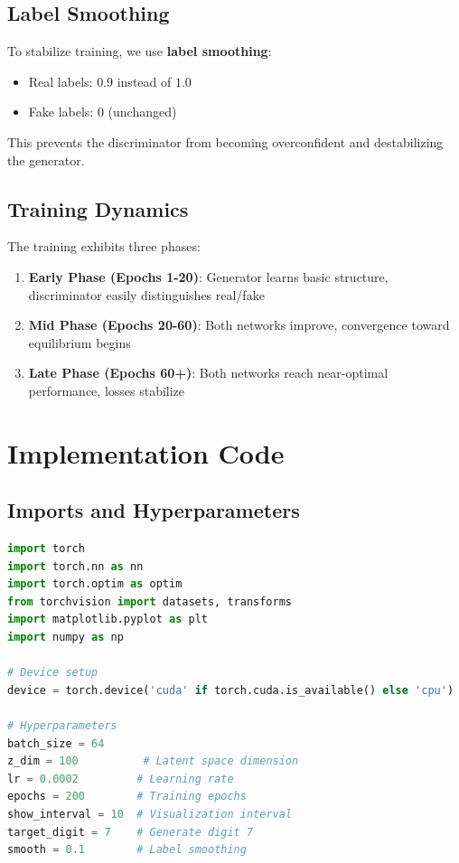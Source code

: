 \documentclass[12pt,a4paper]{article}
\begin{document}
\subsection{Label Smoothing}

To stabilize training, we use \textbf{label smoothing}:
\begin{itemize}
    \item Real labels: $0.9$ instead of $1.0$
    \item Fake labels: $0$ (unchanged)
\end{itemize}

This prevents the discriminator from becoming overconfident and destabilizing the generator.

\subsection{Training Dynamics}

The training exhibits three phases:

\begin{enumerate}
    \item \textbf{Early Phase (Epochs 1-20)}: Generator learns basic structure, discriminator easily distinguishes real/fake
    \item \textbf{Mid Phase (Epochs 20-60)}: Both networks improve, convergence toward equilibrium begins
    \item \textbf{Late Phase (Epochs 60+)}: Both networks reach near-optimal performance, losses stabilize
\end{enumerate}

\section{Implementation Code} \label{sec:implementation}

\subsection{Imports and Hyperparameters}

\begin{lstlisting}[language=Python, caption=Required imports and hyperparameter setup]
import torch
import torch.nn as nn
import torch.optim as optim
from torchvision import datasets, transforms
import matplotlib.pyplot as plt
import numpy as np

# Device setup
device = torch.device('cuda' if torch.cuda.is_available() else 'cpu')

# Hyperparameters
batch_size = 64
z_dim = 100          # Latent space dimension
lr = 0.0002         # Learning rate
epochs = 200        # Training epochs
show_interval = 10  # Visualization interval
target_digit = 7    # Generate digit 7
smooth = 0.1        # Label smoothing
\end{lstlisting}
\end{document}
